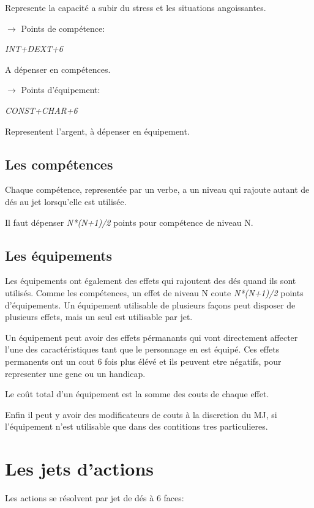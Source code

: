 \begin{landscape}
\begin{multicols}{4}
Represente la capacité a subir du stress et les situations angoissantes.



$\rightarrow$ Points de compétence:

\textit{INT+DEXT+6}

A dépenser en compétences.


$\rightarrow$ Points d'équipement:	

\textit{CONST+CHAR+6}

Representent l'argent, à dépenser en équipement. 
	

\subsection{Les compétences}

Chaque compétence, representée par un verbe, a un niveau qui rajoute autant de dés au jet lorsqu'elle est utilisée.
	
Il faut dépenser \textit{N*(N+1)/2} points pour compétence de niveau N.


\subsection{Les équipements}

Les équipements ont également des effets qui rajoutent des dés quand ils sont utilisés. 
Comme les compétences, un effet de niveau N coute \textit{N*(N+1)/2} points d'équipements.
Un équipement utilisable de plusieurs façons peut disposer de plusieurs effets, mais un seul est utilisable par jet. 

Un équipement peut avoir des effets pérmanants qui vont directement affecter l'une des caractéristiques tant que le personnage en est équipé.
Ces effets permanents ont un cout 6 fois plus élévé et ils peuvent etre négatifs, pour representer une gene ou un handicap.


Le coût total d'un équipement est la somme des couts de chaque effet.

Enfin il peut y avoir des modificateurs de couts à la discretion du MJ, si l'équipement n'est utilisable que dans des contitions tres particulieres.


\section{Les jets d'actions}
	
Les actions se résolvent par jet de dés à 6 faces: 


\end{multicols}
\end{landscape}
